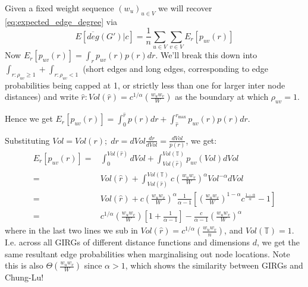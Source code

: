 Given a fixed weight sequence $(w_u)_{u \in V}$ we will recover \cref{eq:expected_edge_degree} via 
\begin{equation}
    E[\overline{deg}(G') | c] = \frac{1}{n} \sum_{u \in V} \sum_{v \in V} E_r[p_{uv}(r)]
\end{equation}
Now $E_r[p_{uv}(r)] = \int_r p_{uv}(r) p(r) dr$. We'll break this down into $\int_{r: \rho_{uv} \geq 1} + \int_{r: \rho_{uv} < 1}$ (short edges and long edges, corresponding to edge probabilities being capped at 1, or strictly less than one for larger inter node distances) and write $\hat{r} : Vol(\hat{r}) = c^{1/\alpha} \left ( \frac{w_u w_v}{W} \right )$ as the boundary at which $\rho_{uv} = 1$.

Hence we get $E_r[p_{uv}(r)] = \int_0^{\hat{r}} p(r) dr + \int_{\hat{r}}^{r_{\max}} p_{uv}(r) p(r) dr$.

Substituting $Vol = Vol(r);\; dr = dVol \frac{dr}{dVol} = \frac{dVol}{p(r)}$, we get:
\begin{align}
    E_r[p_{uv}(r)] =& 
    \int_0^{Vol(\hat{r})} dVol + 
    \int_{Vol(\hat{r})}^{Vol(\mathbb{T})} p_{uv}(Vol) dVol
    \\
    =&
    Vol(\hat{r}) + 
    \int_{Vol(\hat{r})}^{Vol(\mathbb{T})} 
    c \left (\frac{w_u w_v}{W} \right )^\alpha Vol^{-\alpha}  
        dVol
    \\
    =&
    Vol(\hat{r}) + 
    c \left (\frac{w_u w_v}{W} \right )^\alpha \frac{1}{\alpha - 1}
        \left [
            \left (\frac{w_u w_v}{W} \right )^{1 - \alpha} c^{\frac{1 - \alpha}{\alpha}} - 1
        \right ]
    \\
    =&
    c^{1/\alpha} \left (\frac{w_u w_v}{W} \right ) 
        \left [ 1 + \frac{1}{\alpha - 1} \right ] 
    - 
    \frac{c}{\alpha - 1} \left (\frac{w_u w_v}{W} \right )^\alpha
    \label{eq:p_u_to_v_marginal_on_position}
\end{align}
where in the last two lines we sub in $Vol(\hat{r}) = c^{1/\alpha} \left (\frac{w_u w_v}{n} \right )$, and $Vol(\mathbb{T}) = 1$.
I.e. across all GIRGs of different distance functions and dimensions $d$, we get the same resultant edge probabilities when marginalising out node locations. Note this is also $\Theta(\frac{w_u w_v}{W})$ since $\alpha > 1$, which shows the similarity between GIRGs and Chung-Lu!

